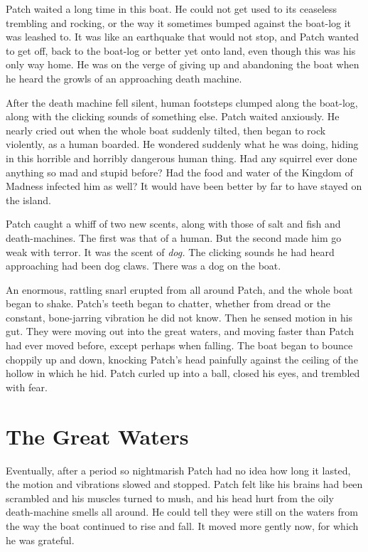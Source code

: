 \documentclass[ebook,oneside,openany,17pt]{memoir}
\newenvironment{tolerant}[1]{%
  \par\tolerance=#1\relax
}{%
  \par
}
\renewcommand{\thechapter}{\Roman{chapter}}
\newcounter{sections}
\newcommand{\sections}[1]{%
  \section*{#1}
  \addtocounter{sections}{1}%
  \pdfbookmark[1]{#1}{section.\thechapter.\thesections}}
\begin{document}
Patch waited a long time in this boat. He could not get used to its
ceaseless trembling and rocking, or the way it sometimes bumped
against the boat-log it was leashed to. It was like an earthquake that
would not stop, and Patch wanted to get off, back to the boat-log or
better yet onto land, even though this was his only way home. He was
on the verge of giving up and abandoning the boat when he heard the
growls of an approaching death machine.

After the death machine fell silent, human footsteps clumped along the
boat-log, along with the clicking sounds of something else. Patch
waited anxiously. He nearly cried out when the whole boat suddenly
tilted, then began to rock violently, as a human boarded. He wondered
suddenly what he was doing, hiding in this horrible and horribly
dangerous human thing. Had any squirrel ever done anything so mad and
stupid before? Had the food and water of the Kingdom of Madness
infected him as well? It would have been better by far to have stayed
on the island.

Patch caught a whiff of two new scents, along with those of salt and
fish and death-machines. The first was that of a human. But the second
made him go weak with terror. It was the scent of \emph{dog.} The
clicking sounds he had heard approaching had been dog claws. There was
a dog on the boat.

\begin{tolerant}{1000}
An enormous, rattling snarl erupted from all around Patch, and the
whole boat began to shake. Patch’s teeth began to chatter, whether
from dread or the constant, bone-jarring vibration he did not
know. Then he sensed motion in his gut. They were moving out into the
great waters, and moving faster than Patch had ever moved before,
except perhaps when falling. The boat began to bounce choppily up and
down, knocking Patch’s head painfully against the ceiling of the
hollow in which he hid. Patch curled up into a ball, closed his eyes,
and trembled with fear.
\end{tolerant}


\sections{The Great Waters}

\begin{tolerant}{2000}
Eventually, after a period so nightmarish Patch had no idea how long
it lasted, the motion and vibrations slowed and stopped. Patch felt
like his brains had been scrambled and his muscles turned to mush, and
his head hurt from the oily death-machine smells all around. He could
tell they were still on the waters from the way the boat continued to
rise and fall. It moved more gently now, for which he was grateful.
\end{tolerant}
\end{document}
